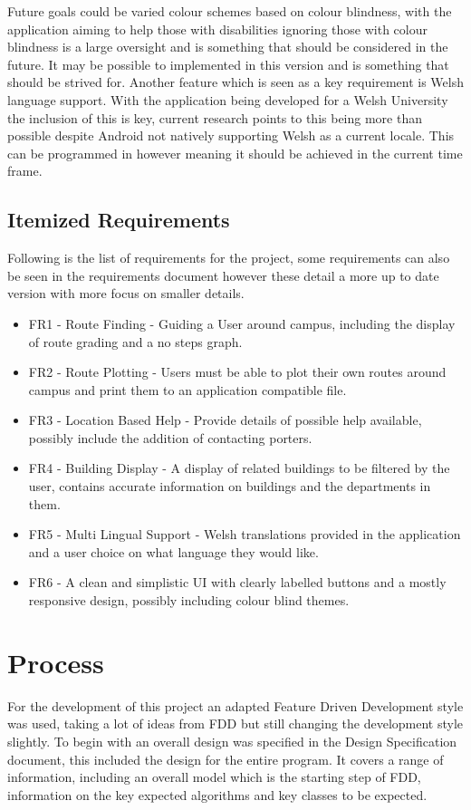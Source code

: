 Future goals could be varied colour schemes based on colour blindness, with the application aiming to help those with disabilities ignoring those with colour blindness is a large oversight and is something that should be considered in the future. It may be possible to implemented in this version and is something that should be strived for. Another feature which is seen as a key requirement is Welsh language support. With the application being developed for a Welsh University the inclusion of this is key, current research points to this being more than possible despite Android not natively supporting Welsh as a current locale. This can be programmed in however meaning it should be achieved in the current time frame. 
\subsection{Itemized Requirements}
Following is the list of requirements for the project, some requirements can also be seen in the requirements document however these detail a more up to date version with more focus on smaller details.

\begin{itemize}
	\item FR1 - Route Finding - Guiding a User around campus, including the display of route grading and a no steps graph.
	\item FR2 - Route Plotting - Users must be able to plot their own routes around campus and print them to an application compatible file.
	\item FR3 - Location Based Help - Provide details of possible help available, possibly include the addition of contacting porters. 
	\item FR4 - Building Display - A display of related buildings to be filtered by the user, contains accurate information on buildings and the departments in them. 
	\item FR5 - Multi Lingual Support - Welsh translations provided in the application and a user choice on what language they would like. 
	\item FR6 - A clean and simplistic UI with clearly labelled buttons and a mostly responsive design, possibly including colour blind themes.
\end{itemize}
\section{Process}
For the development of this project an adapted Feature Driven Development style was used, taking a lot of ideas from FDD but still changing the development style slightly. To begin with an overall design was specified in the Design Specification document, this included the design for the entire program. It covers a range of information, including an overall model which is the starting step of FDD, information on the key expected algorithms and key classes to be expected. 

